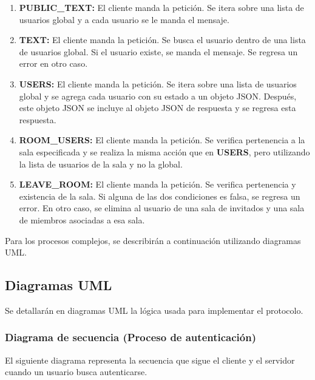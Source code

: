 \documentclass[12pt,a4paper]{article}
\begin{document}
\begin{enumerate}
  \item \textbf{PUBLIC\_TEXT:} El cliente manda la petición. Se itera sobre una lista de usuarios global y a cada usuario se le manda el mensaje.
  \item \textbf{TEXT:} El cliente manda la petición. Se busca el usuario dentro de una lista de usuarios global. Si el usuario existe, se manda el mensaje. Se regresa un error en otro caso. 
  \item \textbf{USERS:} El cliente manda la petición. Se itera sobre una lista de usuarios global y se agrega cada usuario con su estado a un objeto JSON. Después, este objeto JSON se incluye al objeto JSON de respuesta y se regresa esta respuesta. 
  \item \textbf{ROOM\_USERS:} El cliente manda la petición. Se verifica pertenencia a la sala especificada y se realiza la misma acción que en \textbf{USERS}, pero utilizando la lista de usuarios de la sala y no la global. 
  \item \textbf{LEAVE\_ROOM:} El cliente manda la petición. Se verifica pertenencia y existencia de la sala. Si alguna de las dos condiciones es falsa, se regresa un error. En otro caso, se elimina al usuario de una sala de invitados y una sala de miembros asociadas a esa sala.
\end{enumerate}

Para los procesos complejos, se describirán a continuación utilizando diagramas UML.

\subsection{Diagramas UML}
Se detallarán en diagramas UML la lógica usada para implementar el protocolo.

\subsubsection{Diagrama de secuencia (Proceso de autenticación)}
El siguiente diagrama representa la secuencia que sigue el cliente y el servidor cuando un usuario busca autenticarse. 

%
\end{document}
